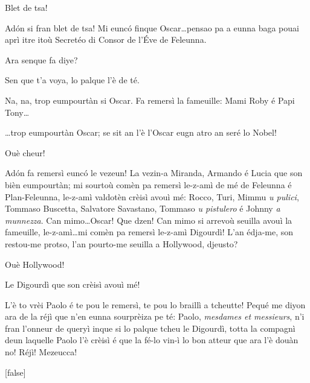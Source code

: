 \begin{drama}
\Conducteurspeaks Blet de tsa!

\Cimaspeaks Ad\'on si fran blet de tsa!  Mi eunc\'o finque Oscar\ldots pensao pa a eunna baga pouai aprì itre itoù Secretéo di Consor de l'\'Eve de Feleunna.


\Cimaspeaks Ara senque fa diye?

\Conducteurspeaks Sen que t'a voya, lo palque l'è de té.

\Cimaspeaks{} Na, na, trop eumpourtàn si Oscar. Fa remersì la fameuille: Mami Roby é Papi Tony\ldots 


\Cimaspeaks \ldots trop eumpourtàn Oscar; se sit an l'è l'Oscar eugn atro an seré lo Nobel!

\Conducteurspeaks Ouè cheur!

 \Cimaspeaks{} Ad\'on fa remersì euncó le vezeun! La vezin-a Miranda, Armando é Lucia que son bièn eumpourtàn; mi sourtoù comèn pa remersì le-z-amì de mé de Feleunna é Plan-Feleunna, le-z-amì valdotèn crèisì avouì mé: Rocco, Turi, Mimmu \textit{u pulici}, Tommaso Buscetta, Salvatore Savastano, Tommaso \textit{u pistulero} é Johnny \textit{a munnezza}. Can mimo\ldots Oscar! Que dzen! Can mimo si arrevoù seuilla avouì la fameuille, le-z-amì\ldots mi comèn pa remersì le-z-amì Digourdì! L'an édja-me, son restou-me protso, l'an pourto-me seuilla a Hollywood, djeusto?

\Conducteurspeaks Ouè Hollywood!

\Cimaspeaks Le Digourdì que son crèisì avouì mé!

\Conducteurspeaks L'è to vrèi Paolo é te pou le remersì, te pou lo braillì a tcheutte! Pequé me diyon ara de la réjì que n'en eunna sourprèiza pe té: Paolo, \textit{mesdames et messieurs}, n'i fran l'onneur de queryì inque si lo palque tcheu le Digourdì, totta la compagnì deun laquelle Paolo l'è crèisì é que la fé-lo vin-ì lo bon atteur que ara l'è douàn no! Réjì! Mezeucca!

{}[false]



\end{drama}
